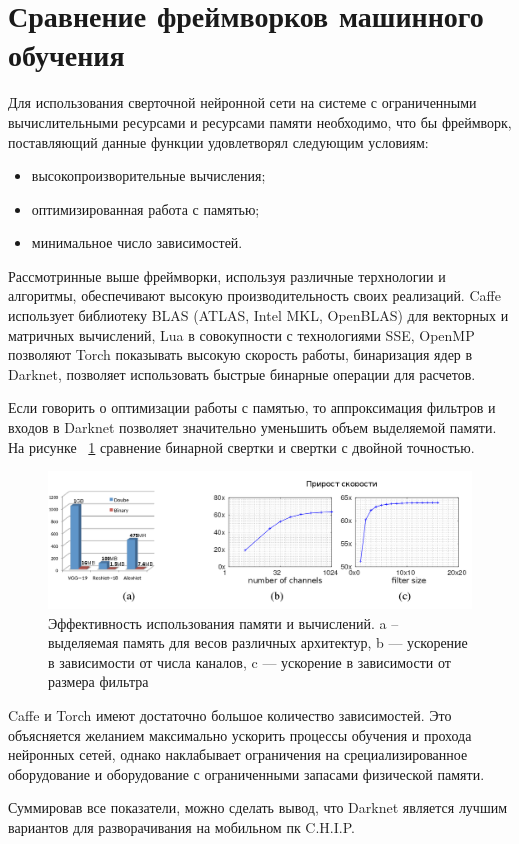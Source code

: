 \documentclass[a4paper,english,russian]{G2-105}
\begin{document}
\section{Сравнение фреймворков машинного обучения}
Для использования сверточной нейронной сети на системе с ограниченными вычислительными ресурсами и ресурсами памяти необходимо, что бы фреймворк, поставляющий данные функции удовлетворял следующим условиям:
\begin{itemize}
\item высокопроизворительные вычисления;
\item оптимизированная работа с памятью;
\item минимальное число зависимостей.
\end{itemize}
\par Рассмотринные выше фреймворки, используя различные терхнологии и алгоритмы, обеспечивают высокую производительность своих реализаций. Caffe использует библиотеку BLAS (ATLAS, Intel MKL, OpenBLAS) для векторных и матричных вычислений, Lua в совокупности с технологиями SSE, OpenMP позволяют Torch показывать высокую скорость работы, бинаризация ядер в Darknet, позволяет использовать быстрые бинарные операции для расчетов.
\par Если говорить о оптимизации работы с памятью, то аппроксимация фильтров и входов в Darknet позволяет значительно уменьшить объем выделяемой памяти. На рисунке ~\ref{binary_conv} сравнение бинарной свертки и свертки с двойной точностью.
\begin{figure}
    \includegraphics[width=0.55\paperheight]{binary_conv.png}
    \caption{Эффективность использования памяти и вычислений. a -- выделяемая память для весов различных архитектур, b --- ускорение в зависимости от числа каналов, c --- ускорение в зависимости от размера фильтра}
	\label{binary_conv}
\end{figure}
\par Caffe и Torch имеют достаточно большое количество зависимостей. Это объясняется желанием максимально ускорить процессы обучения и прохода нейронных сетей, однако наклабывает ограничения на срециализированное оборудование и оборудование с ограниченными запасами физической памяти.
\par Суммировав все показатели, можно сделать вывод, что Darknet является лучшим вариантов для разворачивания на мобильном пк C.H.I.P.
\end{document}
